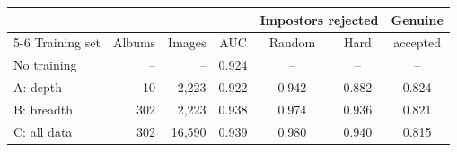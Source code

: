 \begin{tabular}{@{}lrrcccc@{}}
\toprule
 & & & & \multicolumn{2}{c}{Impostors rejected} & Genuine \\
\cmidrule(lr){5-6}
Training set & Albums & Images & AUC & Random & Hard & accepted \\
\midrule
No training & -- & -- & 0.924 & -- & -- & -- \\
A: depth & 10 & 2,223 & 0.922 & 0.942 & 0.882 & 0.824 \\
B: breadth & 302 & 2,223 & 0.938 & 0.974 & 0.936 & 0.821 \\
C: all data & 302 & 16,590 & 0.939 & 0.980 & 0.940 & 0.815 \\
\bottomrule
\end{tabular}
